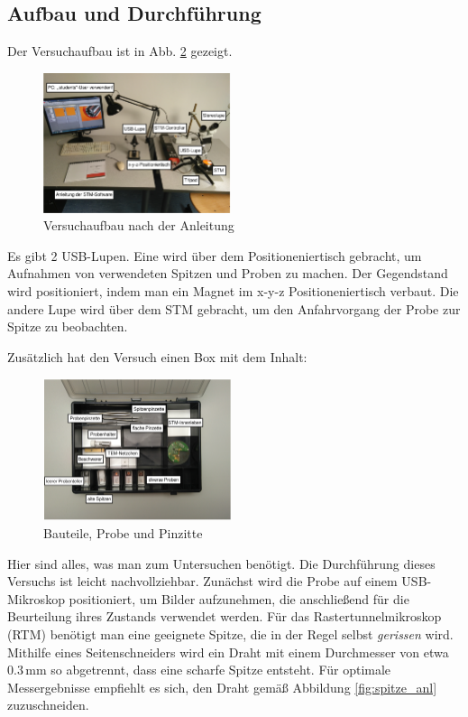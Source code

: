 \documentclass{article}
\begin{document}
\subsection*{Aufbau und Durchführung}
Der Versuchaufbau ist in Abb. \ref{fig:aufbau} gezeigt.
\begin{figure}[h!]
    \centering
    \includegraphics[width=0.49\textwidth]{aufbau.png}
    \caption{Versuchaufbau nach der Anleitung \cite{Anleitung}}
    \label{fig:aufbau}
\end{figure}
Es gibt 2 USB-Lupen. Eine wird über dem Positioneniertisch gebracht, um Aufnahmen von verwendeten Spitzen und
Proben zu machen. Der Gegendstand wird positioniert, indem man ein Magnet im x-y-z Positioneniertisch
verbaut. Die andere Lupe wird über dem STM gebracht, um den Anfahrvorgang der Probe zur Spitze zu 
beobachten.

Zusätzlich hat den Versuch einen Box mit dem Inhalt:
\begin{figure}[h!]
    \centering
    \includegraphics[width=0.49\textwidth]{box-inhalt.png}
    \caption{Bauteile, Probe und Pinzitte \cite{Anleitung}}
    \label{fig:aufbau}
\end{figure}
Hier sind alles, was man zum Untersuchen benötigt.
Die Durchführung dieses Versuchs ist leicht nachvollziehbar. Zunächst wird die Probe auf einem
USB-Mikroskop positioniert, um Bilder aufzunehmen, die anschließend für die Beurteilung 
ihres Zustands verwendet werden. Für das Rastertunnelmikroskop (RTM) benötigt man eine 
geeignete Spitze, die in der Regel selbst \textit{gerissen} wird. Mithilfe eines Seitenschneiders 
wird ein Draht mit einem Durchmesser von etwa $0.3 \, \mathrm{mm}$ so abgetrennt, dass 
eine scharfe Spitze entsteht. Für optimale Messergebnisse empfiehlt es sich, den Draht gemäß 
Abbildung \ref{fig:spitze_anl} zuzuschneiden.
\end{document}
